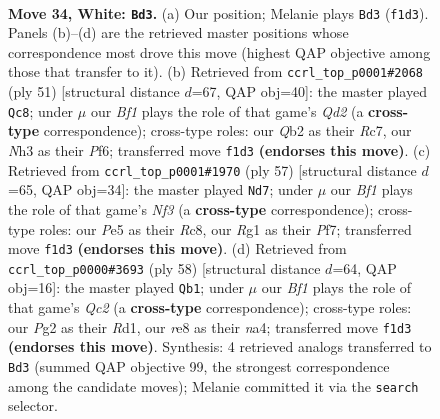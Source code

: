 \documentclass[11pt]{article}
\begin{document}
\clearpage

\begin{figure}[p]\centering
\begin{subfigure}{0.46\textwidth}\centering
\resizebox{\linewidth}{!}{%
\newchessgame
\chessboard[
  setfen={2b1r1k1/5p1p/n1q3p1/4Pp2/p4P2/7N/PQP2KPP/5BR1 w - - 4 34},
  showmover=false,
  pgfstyle=straightmove, color=movearrow, markmove={f1-d3}
]}
\caption{}
\end{subfigure}\hfill
\begin{subfigure}{0.46\textwidth}\centering
\resizebox{\linewidth}{!}{%
\newchessgame
\chessboard[
  setfen={8/p1rq2pk/1p3p1p/1P1np3/8/R2P1PP1/1Q2PB1P/6K1 b - - 4 26},
  showmover=false,
  pgfstyle=straightmove, color=movearrow, markmove={d7-c8}
]}
\caption{}
\end{subfigure}
\\[4pt]
\begin{subfigure}{0.46\textwidth}\centering
\resizebox{\linewidth}{!}{%
\newchessgame
\chessboard[
  setfen={1qr3k1/5pp1/p3pn1p/1b6/pP2P3/P3QN1P/5PP1/1BR3K1 b - - 5 29},
  showmover=false,
  pgfstyle=straightmove, color=movearrow, markmove={f6-d7}
]}
\caption{}
\end{subfigure}\hfill
\begin{subfigure}{0.46\textwidth}\centering
\resizebox{\linewidth}{!}{%
\newchessgame
\chessboard[
  setfen={2r3k1/3qbpp1/p2p3p/1p1P4/n2B4/P4N1P/1PQ2PP1/3R2K1 w - - 4 30},
  showmover=false,
  pgfstyle=straightmove, color=movearrow, markmove={c2-b1}
]}
\caption{}
\end{subfigure}
\caption{\textbf{Move 34, White: \texttt{Bd3}.} (a) Our position; Melanie plays \texttt{Bd3} (\texttt{f1d3}). Panels (b)--(d) are the retrieved master positions whose correspondence most drove this move (highest QAP objective among those that transfer to it). (b) Retrieved from \texttt{ccrl\_top\_p0001\#2068} (ply 51) [structural distance $d$=67, QAP obj=40]: the master played \texttt{Qc8}; under $\mu$ our \emph{Bf1} plays the role of that game's \emph{Qd2} (a \textbf{cross-type} correspondence); cross-type roles: our \emph{Q}b2 as their \emph{R}c7, our \emph{N}h3 as their \emph{P}f6; transferred move \texttt{f1d3} \textbf{(endorses this move)}. (c) Retrieved from \texttt{ccrl\_top\_p0001\#1970} (ply 57) [structural distance $d$=65, QAP obj=34]: the master played \texttt{Nd7}; under $\mu$ our \emph{Bf1} plays the role of that game's \emph{Nf3} (a \textbf{cross-type} correspondence); cross-type roles: our \emph{P}e5 as their \emph{R}c8, our \emph{R}g1 as their \emph{P}f7; transferred move \texttt{f1d3} \textbf{(endorses this move)}. (d) Retrieved from \texttt{ccrl\_top\_p0000\#3693} (ply 58) [structural distance $d$=64, QAP obj=16]: the master played \texttt{Qb1}; under $\mu$ our \emph{Bf1} plays the role of that game's \emph{Qc2} (a \textbf{cross-type} correspondence); cross-type roles: our \emph{P}g2 as their \emph{R}d1, our \emph{r}e8 as their \emph{n}a4; transferred move \texttt{f1d3} \textbf{(endorses this move)}. Synthesis: 4 retrieved analogs transferred to \texttt{Bd3} (summed QAP objective 99, the strongest correspondence among the candidate moves); Melanie committed it via the \texttt{search} selector.}
\label{fig:thought-m66}
\end{figure}
\end{document}
